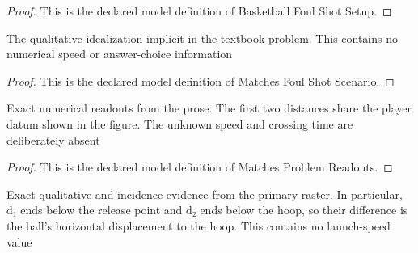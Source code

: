 \begin{proof}
  This is the declared model definition of Basketball Foul Shot Setup.
\end{proof}
\begin{definition}
  \label{def:physics:phyx-mini-0751:phyxminiproblems-problemphyxmini0751-matchesfoulshotscenario}
  The qualitative idealization implicit in the textbook problem. This contains no numerical speed or answer-choice information
\end{definition}
\begin{proof}
  This is the declared model definition of Matches Foul Shot Scenario.
\end{proof}
\begin{definition}
  \label{def:physics:phyx-mini-0751:phyxminiproblems-problemphyxmini0751-matchesproblemreadouts}
  Exact numerical readouts from the prose. The first two distances share the player datum shown in the figure. The unknown speed and crossing time are deliberately absent
\end{definition}
\begin{proof}
  This is the declared model definition of Matches Problem Readouts.
\end{proof}
\begin{definition}
  \label{def:physics:phyx-mini-0751:phyxminiproblems-problemphyxmini0751-matchessuppliedfigure}
  Exact qualitative and incidence evidence from the primary raster. In particular, d₁ ends below the release point and d₂ ends below the hoop, so their difference is the ball's horizontal displacement to the hoop. This contains no launch-speed value
\end{definition}
